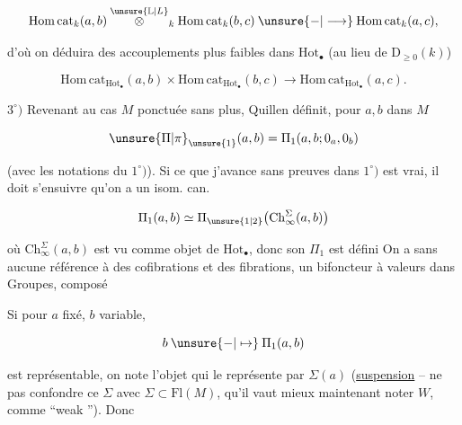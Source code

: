 
\[
 \mathrm{Hom\,cat}_k(a,b)\overset{\unsure{\mathbb L|L}}{\otimes}_k\mathrm{Hom\,cat}_k(b,c)\mathbin{\unsure{-|\longrightarrow}}\mathrm{Hom\,cat}_k(a,c),
\]

d'où on déduira des accouplements plus faibles dans $\mathrm{Hot}_{\bullet}$ (au lieu de $\mathrm D_{\geq 0}(k)$)

\[
 \mathrm{Hom\,cat}_{\mathrm{Hot}_{\bullet}}(a,b)\times
 \mathrm{Hom\,cat}_{\mathrm{Hot}_{\bullet}}(b,c)\longrightarrow
 \mathrm{Hom\,cat}_{\mathrm{Hot}_{\bullet}}(a,c).
\]

$3^\circ)$ Revenant au cas $M$ ponctuée sans plus, Quillen définit, pour $a,b$ dans $M$

\[
 \unsure{\Pi|\pi}_{\unsure{1}}(a,b)=\Pi_1(a,b;0_a,0_b)
\]


(avec les notations du $1^\circ)$). Si ce que j'avance sans preuves dans $1^\circ)$ est vrai, il doit s'ensuivre qu'on a un isom. can.

\[
 \Pi_1(a,b)\simeq\Pi_{\unsure{1|2}}\bigl(\mathrm{Ch}^{\Sigma}_{\infty}(a,b)\bigr)
\]

où $\mathrm{Ch}^{\Sigma}_{\infty}(a,b)$ est vu comme objet de $\mathrm{Hot}_{\bullet}$, donc son $\Pi_1$ est défini On a   sans aucune référence à des cofibrations et des fibrations, un bifoncteur à valeurs dans Groupes, composé 


Si pour $a$ fixé, $b$ variable, 

\[
 b\mathbin{\unsure{-|\mapsto}}\Pi_1(a,b)
\]

est représentable, on note l'objet qui le représente par $\Sigma(a)$  (\uline{suspension} -- ne pas confondre ce $\Sigma$ avec $\Sigma\subset\mathrm{Fl}(M)$, qu'il vaut mieux maintenant noter $W$, comme ``weak ''). Donc

